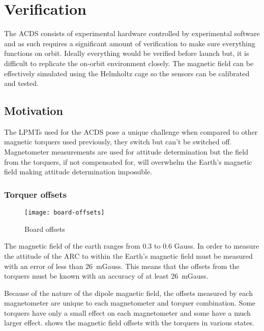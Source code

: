 
\chapter{Verification}

\label{ch:Verification}

The \ac{ACDS} consists of experimental hardware controlled by experimental software and as such requires a significant amount of verification to make sure everything functions on orbit. Ideally everything would be verified before launch but, it is difficult to replicate the on-orbit environment closely. The magnetic field can be effectively simulated using the Helmholtz cage so the sensors can be calibrated and tested. 

\section{Motivation}

The \acp{LPMT} used for the \ac{ACDS} pose a unique challenge when compared to other magnetic torquers used previously, they switch but can't be switched off. Magnetometer measurements are used for attitude determination but the field from the torquers, if not compensated for, will overwhelm the Earth's magnetic field making attitude determination impossible.

\subsection{Torquer offsets}

\begin{sidewaysfigure}
    \centering
    \texttt{[image: board-offsets]}
    \caption{Board offsets}
    \label{fig:b-offset}
\end{sidewaysfigure}



The magnetic field of the earth ranges from 0.3 to 0.6 Gauss\cite[pp.~114]{Wertz}. In order to measure the attitude of the \ac{ARC} to within {\textdegree} the Earth's magnetic field must be measured with an error of less than 26~mGauss. This means that the offsets from the torquers must be known with an accuracy of at least 26~mGauss. 

Because of the nature of the dipole magnetic field, the offsets measured by each magnetometer are unique to each magnetometer and torquer combination. Some torquers have only a small effect on each magnetometer and some have a much larger effect.  shows the magnetic field offsets with the torquers in various states. 

